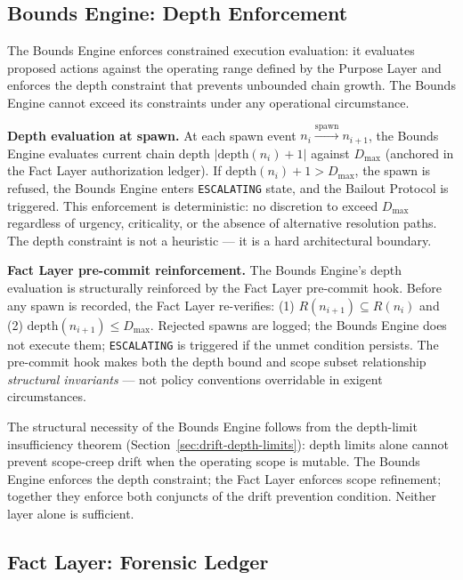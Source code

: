 \subsection{Bounds Engine: Depth Enforcement}
\label{sec:rs-bounds}

The Bounds Engine enforces constrained execution evaluation: it evaluates proposed actions against the operating range defined by the Purpose Layer and enforces the depth constraint that prevents unbounded chain growth. The Bounds Engine cannot exceed its constraints under any operational circumstance.

\medskip
\noindent\textbf{Depth evaluation at spawn.} At each spawn event $n_i \xrightarrow{\text{spawn}} n_{i+1}$, the Bounds Engine evaluates current chain depth $|\text{depth}(n_i) + 1|$ against $D_{\max}$ (anchored in the Fact Layer authorization ledger). If $\text{depth}(n_i) + 1 > D_{\max}$, the spawn is refused, the Bounds Engine enters \texttt{ESCALATING} state, and the Bailout Protocol is triggered. This enforcement is deterministic: no discretion to exceed $D_{\max}$ regardless of urgency, criticality, or the absence of alternative resolution paths. The depth constraint is not a heuristic — it is a hard architectural boundary.

\medskip
\noindent\textbf{Fact Layer pre-commit reinforcement.} The Bounds Engine's depth evaluation is structurally reinforced by the Fact Layer pre-commit hook. Before any spawn is recorded, the Fact Layer re-verifies: (1) $R(n_{i+1}) \subseteq R(n_i)$ and (2) $\text{depth}(n_{i+1}) \leq D_{\max}$. Rejected spawns are logged; the Bounds Engine does not execute them; \texttt{ESCALATING} is triggered if the unmet condition persists. The pre-commit hook makes both the depth bound and scope subset relationship \emph{structural invariants} — not policy conventions overridable in exigent circumstances.

The structural necessity of the Bounds Engine follows from the depth-limit insufficiency theorem (Section~\ref{sec:drift-depth-limits}): depth limits alone cannot prevent scope-creep drift when the operating scope is mutable. The Bounds Engine enforces the depth constraint; the Fact Layer enforces scope refinement; together they enforce both conjuncts of the drift prevention condition. Neither layer alone is sufficient.

\subsection{Fact Layer: Forensic Ledger}
\label{sec:rs-fact-ledger}

